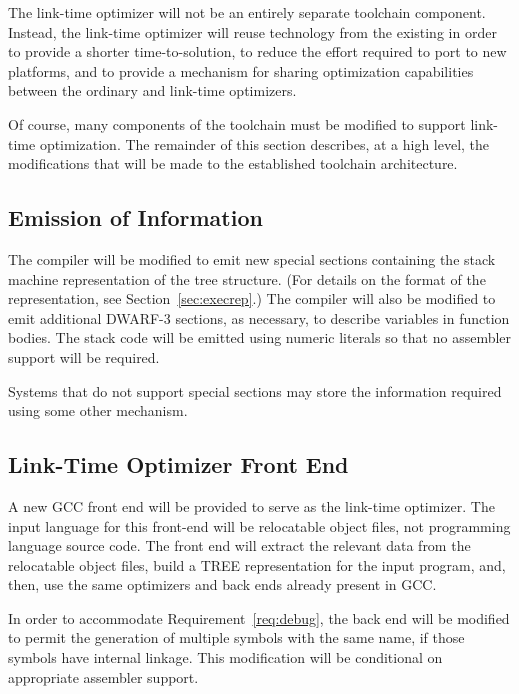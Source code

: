 The link-time optimizer will not be an entirely separate toolchain
component.  Instead, the link-time optimizer will reuse technology
from the existing in order to provide a shorter time-to-solution, to
reduce the effort required to port to new platforms, and to provide a
mechanism for sharing optimization capabilities between the ordinary
and link-time optimizers.

Of course, many components of the toolchain must be modified to
support link-time optimization.  The remainder of this section
describes, at a high level, the modifications that will be made to the
established toolchain architecture.

\subsection{Emission of Information}

The compiler will be modified to emit new special sections containing
the stack machine representation of the tree structure.  (For details
on the format of the representation, see Section~\ref{sec:execrep}.)
The compiler will also be modified to emit additional DWARF-3
sections, as necessary, to describe variables in function bodies.  The
stack code will be emitted using numeric literals so that no assembler
support will be required.

\begin{note}
 Systems that do not support special sections may store the
 information required using some other mechanism.
\end{note}

\subsection{Link-Time Optimizer Front End}

A new GCC front end will be provided to serve as the link-time
optimizer. The input language for this front-end will be relocatable
object files, not programming language source code.  The front end
will extract the relevant data from the relocatable object files,
build a TREE representation for the input program, and, then, use the
same optimizers and back ends already present in GCC.

In order to accommodate Requirement~\ref{req:debug}, the back end will
be modified to permit the generation of multiple symbols with the same
name, if those symbols have internal linkage.  This modification will
be conditional on appropriate assembler support.

